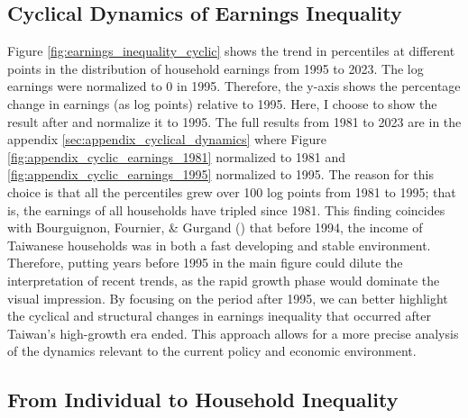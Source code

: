 \documentclass{article}
\begin{document}
\subsection{Cyclical Dynamics of Earnings Inequality}

Figure \ref{fig:earnings_inequality_cyclic} shows the trend in percentiles at different points in the distribution of household earnings from 1995 to 2023. The log earnings were normalized to 0 in 1995. Therefore, the y-axis shows the percentage change in earnings (as log points) relative to 1995.
Here, I choose to show the result after and normalize it to 1995. The full results from 1981 to 2023 are in the appendix \ref{sec:appendix_cyclical_dynamics} where Figure \ref{fig:appendix_cyclic_earnings_1981} normalized to 1981 and \ref{fig:appendix_cyclic_earnings_1995} normalized to 1995. 
The reason for this choice is that all the percentiles grew over 100 log points from 1981 to 1995; that is, the earnings of all households have tripled since 1981.
This finding coincides with Bourguignon, Fournier, \& Gurgand (\citeyear{TW_stable_dist}) that before 1994, the income of Taiwanese households was in both a fast developing and stable environment.
Therefore, putting years before 1995 in the main figure could dilute the interpretation of recent trends, as the rapid growth phase would dominate the visual impression. By focusing on the period after 1995, we can better highlight the cyclical and structural changes in earnings inequality that occurred after Taiwan's high-growth era ended. This approach allows for a more precise analysis of the dynamics relevant to the current policy and economic environment.


\subsection{From Individual to Household Inequality}
\end{document}

